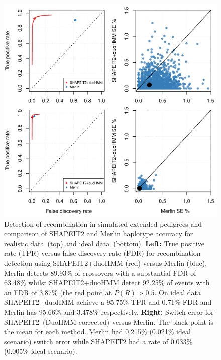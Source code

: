 \begin{figure}
  \begin{center} 
    \includegraphics[width=\textwidth]{chap4figs/chrx_experiment_fullped-final.pdf}
  \end{center}
\caption[Comparison of SHAPEIT2 and Merlin on simulated pedigrees]{ Detection of recombination in simulated extended pedigrees and comparison of SHAPEIT2 and Merlin haplotype accuracy for realistic data~(top) and ideal data~(bottom). \textbf{Left:} True positive rate (TPR) versus false discovery rate (FDR) for recombination detection using SHAPEIT2+duoHMM (red) versus Merlin (blue). Merlin detects 89.93\% of crossovers with a substantial FDR of 63.48\% whilst SHAPEIT2+duoHMM detect 92.25\% of events with an FDR of 3.87\% (the red point at $P(R) > 0.5$. On ideal data SHAPEIT2+duoHMM achieve a 95.75\% TPR and 0.71\% FDR and Merlin has 95.66\% and 3.478\% respectively.  \textbf{Right:} Switch error for SHAPEIT2~(DuoHMM corrected) versus Merlin.  The black point is the mean for each method.  Merlin had  0.215\% (0.021\% ideal scenario) switch error while SHAPEIT2 had a rate of 0.033\% (0.005\% ideal scenario).
\label{fig:simfig2}}
\end{figure}


